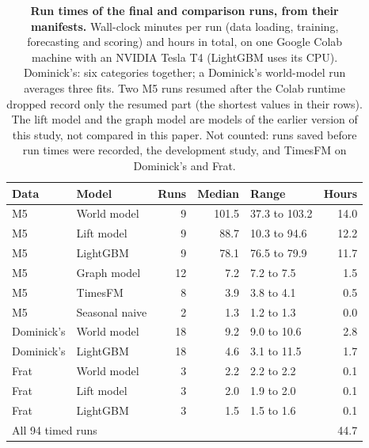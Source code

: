 \begin{table}[t]
\centering
\caption{\textbf{Run times of the final and comparison runs, from their manifests.} Wall-clock minutes per
run (data loading, training, forecasting and scoring) and hours in total, on one Google Colab machine with an NVIDIA Tesla T4 (LightGBM uses its CPU). Dominick's:
six categories together; a Dominick's world-model run averages three fits. Two M5 runs resumed after the
Colab runtime dropped record only the resumed part (the shortest values in their rows). The lift model and the graph model are models of the earlier version of this study, not compared in this paper. Not counted: runs saved before
run times were recorded, the development study, and TimesFM on Dominick's and Frat.}
\label{tab:compute}
\footnotesize
\setlength{\tabcolsep}{3.5pt}
\begin{tabular}{llrrlr}
\toprule
\textbf{Data} & \textbf{Model} & \textbf{Runs} & \textbf{Median} & \textbf{Range} & \textbf{Hours} \\
\midrule
M5 & World model & 9 & 101.5 & 37.3 to 103.2 & 14.0 \\
M5 & Lift model & 9 & 88.7 & 10.3 to 94.6 & 12.2 \\
M5 & LightGBM & 9 & 78.1 & 76.5 to 79.9 & 11.7 \\
M5 & Graph model & 12 & 7.2 & 7.2 to 7.5 & 1.5 \\
M5 & TimesFM & 8 & 3.9 & 3.8 to 4.1 & 0.5 \\
M5 & Seasonal naive & 2 & 1.3 & 1.2 to 1.3 & 0.0 \\
Dominick's & World model & 18 & 9.2 & 9.0 to 10.6 & 2.8 \\
Dominick's & LightGBM & 18 & 4.6 & 3.1 to 11.5 & 1.7 \\
Frat & World model & 3 & 2.2 & 2.2 to 2.2 & 0.1 \\
Frat & Lift model & 3 & 2.0 & 1.9 to 2.0 & 0.1 \\
Frat & LightGBM & 3 & 1.5 & 1.5 to 1.6 & 0.1 \\
\midrule
\multicolumn{5}{l}{All 94 timed runs} & 44.7 \\
\bottomrule
\end{tabular}
\end{table}
